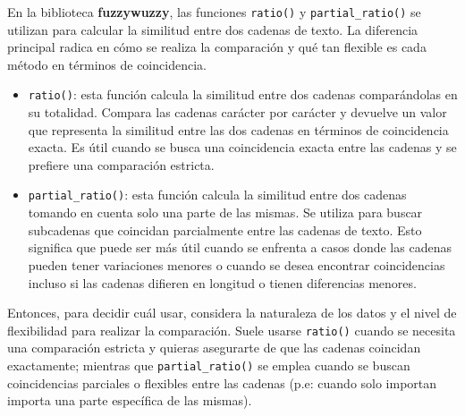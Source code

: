 \documentclass[
  a4paper,
  DIV=11,
  numbers=noendperiod]{scrreprt}
\providecommand{\tightlist}{%
  \setlength{\itemsep}{0pt}\setlength{\parskip}{0pt}}\usepackage{longtable,booktabs,array}
\begin{document}
En la biblioteca \textbf{fuzzywuzzy}, las funciones \texttt{ratio()} y
\texttt{partial\_ratio()} se utilizan para calcular la similitud entre
dos cadenas de texto. La diferencia principal radica en cómo se realiza
la comparación y qué tan flexible es cada método en términos de
coincidencia.

\begin{itemize}
\tightlist
\item
  \texttt{ratio()}: esta función calcula la similitud entre dos cadenas
  comparándolas en su totalidad. Compara las cadenas carácter por
  carácter y devuelve un valor que representa la similitud entre las dos
  cadenas en términos de coincidencia exacta. Es útil cuando se busca
  una coincidencia exacta entre las cadenas y se prefiere una
  comparación estricta.
\item
  \texttt{partial\_ratio()}: esta función calcula la similitud entre dos
  cadenas tomando en cuenta solo una parte de las mismas. Se utiliza
  para buscar subcadenas que coincidan parcialmente entre las cadenas de
  texto. Esto significa que puede ser más útil cuando se enfrenta a
  casos donde las cadenas pueden tener variaciones menores o cuando se
  desea encontrar coincidencias incluso si las cadenas difieren en
  longitud o tienen diferencias menores.
\end{itemize}

Entonces, para decidir cuál usar, considera la naturaleza de los datos y
el nivel de flexibilidad para realizar la comparación. Suele usarse
\texttt{ratio()} cuando se necesita una comparación estricta y quieras
asegurarte de que las cadenas coincidan exactamente; mientras que
\texttt{partial\_ratio()} se emplea cuando se buscan coincidencias
parciales o flexibles entre las cadenas (p.e: cuando solo importan
importa una parte específica de las mismas).


\printbibliography


\printindex
\end{document}
